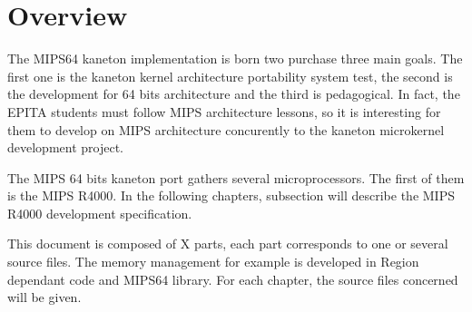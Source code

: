 %
%
%
%
%
%

%
%

\chapter{Overview}

The MIPS64 kaneton implementation is born two purchase three main goals.
The first one is the kaneton kernel architecture portability system test,
the second is the development for 64 bits architecture and the third is pedagogical.
In fact, the EPITA students must follow MIPS architecture lessons, so it is interesting 
for them to develop on MIPS architecture concurently to the kaneton microkernel development
project.

The MIPS 64 bits kaneton port gathers several microprocessors. The first of them is the MIPS R4000. In the following chapters, subsection will describe the MIPS R4000 development specification.

This document is composed of X parts, each part corresponds to one or several source files. The memory management for example is developed in Region dependant code and MIPS64 library. For each chapter, the source files concerned will be given.
